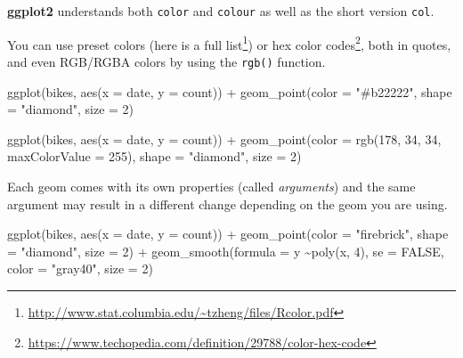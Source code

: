 \documentclass[
]{krantz}
\makeatletter
\newenvironment{Shaded}{\begin{snugshade}}{\end{snugshade}}
\newcommand{\AttributeTok}[1]{\textcolor[rgb]{0.61,0.61,0.61}{#1}}
\newcommand{\ConstantTok}[1]{\textcolor[rgb]{0,0,0}{#1}}
\newcommand{\DecValTok}[1]{\textcolor[rgb]{0.06,0.06,0.06}{#1}}
\newcommand{\FunctionTok}[1]{\textcolor[rgb]{0,0,0}{#1}}
\newcommand{\NormalTok}[1]{#1}
\newcommand{\SpecialCharTok}[1]{\textcolor[rgb]{0,0,0}{#1}}
\newcommand{\StringTok}[1]{\textcolor[rgb]{0.5,0.5,0.5}{#1}}
\renewcommand{\href}[2]{#2\footnote{\url{#1}}}
\newenvironment{kframe}{%
\medskip{}
\setlength{\fboxsep}{.8em}
 \def\at@end@of@kframe{}%
 \ifinner\ifhmode%
  \def\at@end@of@kframe{\end{minipage}}%
  \begin{minipage}{\columnwidth}%
 \fi\fi%
 \def\FrameCommand##1{\hskip\@totalleftmargin \hskip-\fboxsep
 \colorbox{shadecolor}{##1}\hskip-\fboxsep
     \hskip-\linewidth \hskip-\@totalleftmargin \hskip\columnwidth}%
 \MakeFramed {\advance\hsize-\width
   \@totalleftmargin\z@ \linewidth\hsize
   \@setminipage}}%
 {\par\unskip\endMakeFramed%
 \at@end@of@kframe}
\renewenvironment{Shaded}{\begin{kframe}}{\end{kframe}}
\makeatother
\begin{document}
\textbf{ggplot2} understands both \texttt{color} and \texttt{colour} as well as the short version \texttt{col}.

You can use preset colors (here is a \href{http://www.stat.columbia.edu/~tzheng/files/Rcolor.pdf}{full list}) or \href{https://www.techopedia.com/definition/29788/color-hex-code}{hex color codes}, both in quotes, and even RGB/RGBA colors by using the \texttt{rgb()} function.

\begin{Shaded}
\begin{Highlighting}[]
\FunctionTok{ggplot}\NormalTok{(bikes, }\FunctionTok{aes}\NormalTok{(}\AttributeTok{x =}\NormalTok{ date, }\AttributeTok{y =}\NormalTok{ count)) }\SpecialCharTok{+} 
  \FunctionTok{geom\_point}\NormalTok{(}\AttributeTok{color =} \StringTok{"\#b22222"}\NormalTok{, }\AttributeTok{shape =} \StringTok{"diamond"}\NormalTok{, }\AttributeTok{size =} \DecValTok{2}\NormalTok{)}

\FunctionTok{ggplot}\NormalTok{(bikes, }\FunctionTok{aes}\NormalTok{(}\AttributeTok{x =}\NormalTok{ date, }\AttributeTok{y =}\NormalTok{ count)) }\SpecialCharTok{+} 
  \FunctionTok{geom\_point}\NormalTok{(}\AttributeTok{color =} \FunctionTok{rgb}\NormalTok{(}\DecValTok{178}\NormalTok{, }\DecValTok{34}\NormalTok{, }\DecValTok{34}\NormalTok{, }\AttributeTok{maxColorValue =} \DecValTok{255}\NormalTok{), }\AttributeTok{shape =} \StringTok{"diamond"}\NormalTok{, }\AttributeTok{size =} \DecValTok{2}\NormalTok{)}
\end{Highlighting}
\end{Shaded}

Each geom comes with its own properties (called \emph{arguments}) and the same argument may result in a different change depending on the geom you are using.

\begin{Shaded}
\begin{Highlighting}[]
\FunctionTok{ggplot}\NormalTok{(bikes, }\FunctionTok{aes}\NormalTok{(}\AttributeTok{x =}\NormalTok{ date, }\AttributeTok{y =}\NormalTok{ count)) }\SpecialCharTok{+} 
    \FunctionTok{geom\_point}\NormalTok{(}\AttributeTok{color =} \StringTok{"firebrick"}\NormalTok{, }\AttributeTok{shape =} \StringTok{"diamond"}\NormalTok{, }\AttributeTok{size =} \DecValTok{2}\NormalTok{) }\SpecialCharTok{+} 
    \FunctionTok{geom\_smooth}\NormalTok{(}\AttributeTok{formula =}\NormalTok{ y  }\SpecialCharTok{\textasciitilde{}}\FunctionTok{poly}\NormalTok{(x, }\DecValTok{4}\NormalTok{), }\AttributeTok{se =} \ConstantTok{FALSE}\NormalTok{, }
                \AttributeTok{color =} \StringTok{"gray40"}\NormalTok{, }\AttributeTok{size =} \DecValTok{2}\NormalTok{)}
\end{Highlighting}
\end{Shaded}
\end{document}
